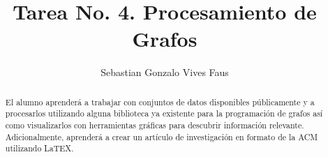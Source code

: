 \documentclass[acmlarge,screen]{acmart}
\begin{document}
%
\title{Tarea No. 4. Procesamiento de Grafos}

%

\author{Sebastian Gonzalo Vives Faus}



%
\begin{abstract}
El alumno aprenderá a trabajar con conjuntos de datos disponibles públicamente y a procesarlos utilizando alguna biblioteca ya existente para la programación de grafos así como visualizarlos con herramientas gráficas para descubrir información relevante. Adicionalmente, aprenderá a crear un artículo de investigación en formato de la ACM utilizando LaTEX.
\end{abstract}
\end{document}
